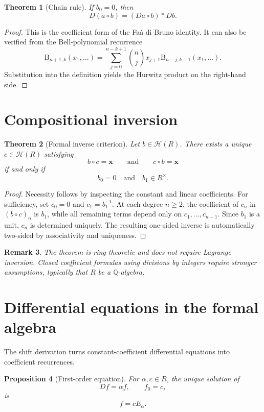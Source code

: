 \documentclass[11pt]{article}
\newtheorem{theorem}{Theorem}[section]
\newtheorem{proposition}[theorem]{Proposition}
\newtheorem{remark}[theorem]{Remark}
\newcommand{\Hurs}{\mathcal H}
\newcommand{\Q}{\mathbb Q}
\newcommand{\Bell}{\mathrm B}
\begin{document}
\begin{theorem}[Chain rule]
If $b_0=0$, then
\[
D(a\circ b)=(Da\circ b)*Db.
\]
\end{theorem}

\begin{proof}
This is the coefficient form of the Fa\`a di Bruno identity.  It can also be verified from the Bell-polynomial recurrence
\[
\Bell_{n+1,k}(x_1,\ldots)
=\sum_{j=0}^{n-k+1}\binom nj x_{j+1}\Bell_{n-j,k-1}(x_1,\ldots).
\]
Substitution into the definition yields the Hurwitz product on the right-hand side.
\end{proof}

\section{Compositional inversion}

\begin{theorem}[Formal inverse criterion]
Let $b\in\Hurs(R)$.  There exists a unique $c\in\Hurs(R)$ satisfying
\[
b\circ c=\mathbf x
\qquad\text{and}\qquad
c\circ b=\mathbf x
\]
if and only if
\[
b_0=0
\quad\text{and}\quad
b_1\in R^\times.
\]
\end{theorem}

\begin{proof}
Necessity follows by inspecting the constant and linear coefficients.  For sufficiency, set $c_0=0$ and $c_1=b_1^{-1}$.  At each degree $n\ge2$, the coefficient of $c_n$ in $(b\circ c)_n$ is $b_1$, while all remaining terms depend only on $c_1,\ldots,c_{n-1}$.  Since $b_1$ is a unit, $c_n$ is determined uniquely.  The resulting one-sided inverse is automatically two-sided by associativity and uniqueness.
\end{proof}

\begin{remark}
The theorem is ring-theoretic and does not require Lagrange inversion.  Closed coefficient formulas using divisions by integers require stronger assumptions, typically that $R$ be a $\Q$-algebra.
\end{remark}

\section{Differential equations in the formal algebra}

The shift derivation turns constant-coefficient differential equations into coefficient recurrences.

\begin{proposition}[First-order equation]
For $\alpha,c\in R$, the unique solution of
\[
Df=\alpha f,
\qquad f_0=c,
\]
is
\[
f=cE_\alpha.
\]
\end{proposition}
\end{document}
